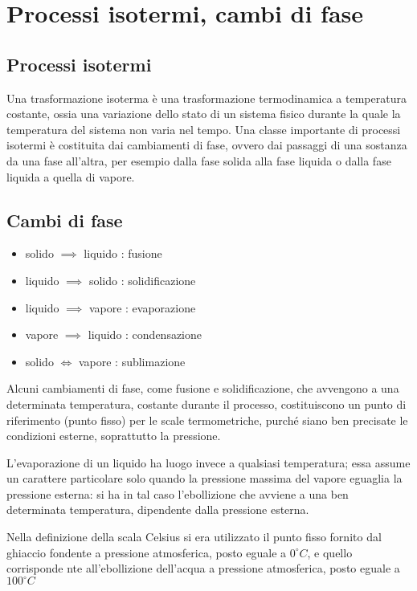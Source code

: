 \documentclass[class=book, crop=false, oneside, 12pt]{standalone}
\begin{document}
\section{Processi isotermi, cambi di fase}

\subsection{Processi isotermi}

Una trasformazione isoterma è una trasformazione termodinamica a temperatura costante, ossia una variazione dello stato di un sistema fisico durante la quale la temperatura del sistema non varia nel tempo.
Una classe importante di processi isotermi è costituita dai cambiamenti di fase, ovvero dai passaggi di una sostanza da una fase all'altra, per esempio dalla fase solida alla fase liquida o dalla fase liquida a quella di vapore.

\subsection{Cambi di fase}

\begin{itemize}
    \item solido \(\implies\) liquido : fusione
    \item liquido \(\implies\) solido : solidificazione
    \item liquido \(\implies\) vapore : evaporazione
    \item vapore \(\implies\) liquido : condensazione
    \item solido \(\iff\) vapore :  sublimazione
\end{itemize}

Alcuni cambiamenti di fase, come fusione e solidificazione, che avvengono a una determinata temperatura, costante durante il processo, costituiscono un punto di riferimento (punto fisso) per le scale termometriche, purché siano ben precisate le condizioni esterne, soprattutto la pressione.

L'evaporazione di un liquido ha luogo invece a qualsiasi temperatura; essa assume un carattere particolare solo quando la pressione massima del vapore eguaglia la pressione esterna: si ha in tal caso l'ebollizione che avviene a una ben determinata temperatura, dipendente dalla pressione esterna. 

Nella definizione della scala Celsius si era utilizzato il punto fisso fornito dal ghiaccio fondente a pressione atmosferica, posto eguale a \(0 ^{\circ} C\), e quello corrisponde nte all'ebollizione dell'acqua a pressione atmosferica, posto eguale a \(100 ^{\circ} C\)
\end{document}
